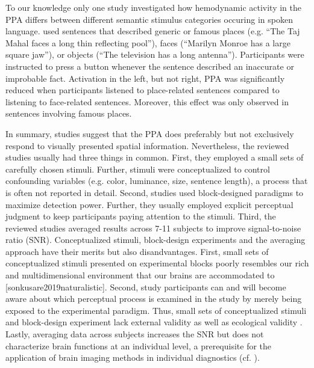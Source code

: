 \documentclass[english]{article}
\begin{document}
To our knowledge only one study \citep{aziz2008modulation} investigated how
hemodynamic activity in the PPA differs between different semantic stimulus
categories occuring in spoken language.
\cite{aziz2008modulation} used sentences that described generic or famous places
(e.g. ``The Taj Mahal faces a long thin reflecting pool''), faces (``Marilyn
Monroe has a large square jaw''), or objects (``The television has a long
antenna'').
Participants were instructed to press a button whenever the sentence described
an inaccurate or improbable fact.
Activation in the left, but not right, PPA was significantly reduced when
participants listened to place-related sentences compared to listening to
face-related sentences. Moreover, this effect was only observed in sentences
involving famous places.

In summary, studies suggest that the PPA does preferably but not exclusively
respond to visually presented spatial information.
Nevertheless, the reviewed studies usually had three things in common.
First, they employed a small sets of carefully chosen stimuli. Further, stimuli
were conceptualized to control confounding variables (e.g. color, luminance,
size, sentence length), a process that is often not reported in
detail.
Second, studies used block-designed paradigms to maximize detection power.
Further, they usually employed explicit perceptual judgment to keep participants
paying attention to the stimuli.
Third, the reviewed studies averaged results across 7-11 subjects to improve
signal-to-noise ratio (SNR).
Conceptualized stimuli, block-design experiments and the averaging approach have
their merits but also disandvantages.
First, small sets of conceptualized stimuli presented on experimental blocks
poorly resembles our rich and multidimensional environment that our brains are
accommodated to [sonkusare2019naturalistic].
Second, study participants can and will become aware about which perceptual
process is examined in the study by merely being exposed to the experimental
paradigm.
Thus, small sets of conceptualized stimuli and block-design experiment lack
external validity \citep{westfall2016fixing} as well as ecological validity
\citep{hasson2004intersubject}.
Lastly, averaging data across subjects increases the SNR but does not
characterize brain functions at an individual level, a prerequisite for the
application of brain imaging methods in individual diagnostics (cf.
\cite{dubois2016building, eickhoff2020towards}).
\end{document}
